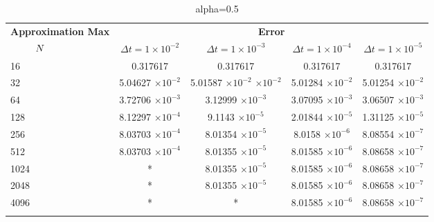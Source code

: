 	
	\begin{table}
		\begin{tabular}{lcccc}
			\toprule
			\multicolumn{1}{c}{\textbf{Approximation Max}} & \multicolumn{4}{c}{\textbf{Error}} \\
			$\hspace{9mm}N$ & $\Delta t=1\times 10^{-2}$ & $\Delta t=1\times 10^{-3}$ & $\Delta t=1\times 10^{-4}$ & $\Delta t=1\times 10^{-5}$ \\
			\midrule
			\hspace{7mm} 16 & 0.317617    & 0.317617    & 0.317617    & 0.317617    \\
			\midrule
			\hspace{7mm} 32 & 5.04627 $\times 10 ^{-2}$   & 5.01587 $\times 10 ^{-2}$ $\times 10 ^{-2}$  & 5.01284 $\times 10 ^{-2}$  & 5.01254 $\times 10 ^{-2}$   \\
			\midrule
			\hspace{7mm} 64 & 3.72706 $\times 10 ^{-3}$  & 3.12999 $\times 10 ^{-3}$  & 3.07095 $\times 10 ^{-3}$ & 3.06507 $\times 10 ^{-3}$  \\
			\midrule
			\hspace{7mm} 128 & 8.12297 $\times 10 ^{-4}$ & 9.1143 $\times 10 ^{-5}$  & 2.01844 $\times 10 ^{-5}$ & 1.31125 $\times 10 ^{-5}$ \\
			\midrule
			\hspace{7mm} 256 & 8.03703 $\times 10 ^{-4}$ & 8.01354 $\times 10 ^{-5}$ & 8.0158 $\times 10 ^{-6}$  & 8.08554 $\times 10 ^{-7}$ \\
			\midrule
			\hspace{7mm} 512 & 8.03703 $\times 10 ^{-4}$ & 8.01355 $\times 10 ^{-5}$ & 8.01585 $\times 10 ^{-6}$ & 8.08658 $\times 10 ^{-7}$ \\
			\midrule
			\hspace{7mm} 1024 & * & 8.01355 $\times 10 ^{-5}$ & 8.01585 $\times 10 ^{-6}$ & 8.08658 $\times 10 ^{-7}$ \\
			\midrule
			\hspace{7mm} 2048 & * & 8.01355 $\times 10 ^{-5}$ & 8.01585 $\times 10 ^{-6}$ & 8.08658 $\times 10 ^{-7}$ \\
			\midrule
			\hspace{7mm} 4096 & * & *  & 8.01585 $\times 10 ^{-6}$ & 8.08658 $\times 10 ^{-7}$ \\
			\\
			\bottomrule
		\end{tabular}
		\caption{alpha=0.5}
	\end{table}	
	
